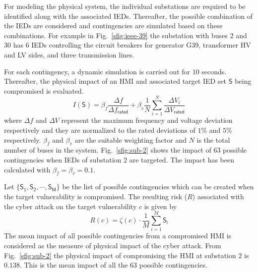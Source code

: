 For modeling the physical system, the individual substations are required to be identified along with the associated IEDs. Thereafter, the possible combination of the IEDs are considered and contingencies are simulated based on these combinations. For example in Fig.~\ref{sfig:ieee-39} the substation with buses $2$ and $30$ has $6$ IEDs controlling the circuit breakers for generator G39, transformer HV and LV sides, and three transmission lines.

For each contingency, a dynamic simulation is carried out for $10$ seconds. Thereafter, the physical impact of an HMI and associated target IED set $\mathsf{S}$ being compromised is evaluated.
\begin{equation}
I(\mathsf{S})=\beta_f\dfrac{\Delta f}{\Delta f_{\mathsf{rated}}}+\beta_v\frac{1}{N}\sum_{i=1}^{N}\dfrac{\Delta V_i}{\Delta V_{\mathsf{rated}}}
\end{equation} 
where $\Delta f$ and $\Delta V$ represent the maximum frequency and voltage deviation respectively and they are normalized to the rated deviations of $1\%$ and $5\%$ respectively. $\beta_f$ and $\beta_v$ are the suitable weighting factor and $N$ is the total number of buses in the system. Fig.~\ref{sfig:sub-2} shows the impact of $63$ possible contingencies when IEDs of substation $2$ are targeted. The impact has been calculated with $\beta_f=\beta_v=0.1$.

Let $\{\mathsf{S_1},\mathsf{S_2},\cdots,\mathsf{S_M}\}$ be the list of possible contingencies which can be created when the target vulnerability is compromised. The resulting risk ($R$) associated with the cyber attack on the target vulnerability $c$ is given by
\begin{equation}
R(c)=\zeta(c)\cdot\dfrac{1}{M}\sum_{i=1}^{M}\mathsf{S_i}
\end{equation}
The mean impact of all possible contingencies from a compromised HMI is considered as the measure of physical impact of the cyber attack. From Fig.~\ref{sfig:sub-2} the physical impact of compromising the HMI at substation $2$ is $0.138$. This is the mean impact of all the $63$ possible contingencies.